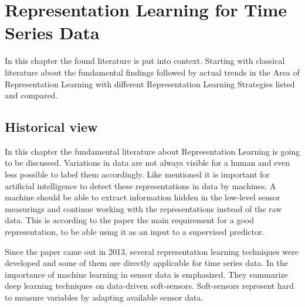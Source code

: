 \section{Representation Learning for Time Series Data}\label{review}
In this chapter the found literature is put into context. Starting with classical literature about the fundamental findings followed by actual trends in the Area of Representation Learning with different Representation Learning Strategies listed and compared.
\subsection{Historical view}
In this chapter the fundamental literature about Representation Learning is going to be discussed.
Variations in data are not always visible for a human and even less possible to label them accordingly. Like \cite{bengio_representation_2013} mentioned it is important for artificial intelligence to detect these representations in data by machines. A machine should be able to extract information hidden in the low-level sensor measurings and continue working with the representations instead of the raw data. This is according to the paper the main requirement for a good representation, to be able using it as an input to a supervised predictor.

Since the paper came out in 2013, several representation learning techniques were developed and some of them are directly applicable for time series data. In \cite{sun_survey_2021} the importance of machine learning in sensor data is emphasized. They summarize deep learning techniques on data-driven soft-sensors. Soft-sensors represent hard to measure variables by adapting available sensor data.%
